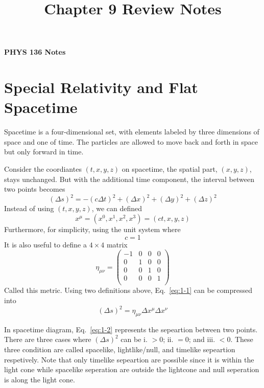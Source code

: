\documentclass[11pt]{article}
\title{Chapter 9 Review Notes}
\theoremstyle{definition}
\numberwithin{equation}{section}
\begin{document}
\begin{center}
{\LARGE \bf PHYS 136 Notes}\\
\end{center}

\section{Special Relativity and Flat Spacetime}

Spacetime is a four-dimensional set, with elements labeled by three dimensions of space and one of time.  The particles are allowed to move back and forth in space but only forward in time.

Consider the coordiantes $(t,x,y,z)$ on spacetime, the spatial part, $(x,y,z)$, stays unchanged. But with the additional time component, the interval between two points becomes
\begin{equation}
    \boxed{(\Delta s)^2 = -(c\Delta t)^2 + (\Delta x)^2 + (\Delta y)^2 + (\Delta z)^2}
    \label{eq:1-1}
\end{equation} 
Instead of using $(t,x,y,z)$, we can defined
\begin{equation}
    x^\mu = (x^0, x^1, x^2, x^3) = (ct,x,y,z)
\end{equation}
Furthermore, for simplicity, using the unit system where
\begin{equation}
    c = 1
\end{equation}
It is also useful to define a $4\times4$ matrix
\begin{equation}
    \eta_{\mu\nu} = \begin{pmatrix}
        -1 & 0 & 0 & 0\\
        0 & 1 & 0 & 0\\
        0 & 0 & 1 & 0\\
        0 & 0 & 0 & 1\\
    \end{pmatrix}
\end{equation}
Called this metric. Using two definitions above, Eq.~\ref{eq:1-1} can be compressed into
\begin{equation}
    (\Delta s)^2 = \eta_{\mu\nu}\Delta x^\mu \Delta x^\nu
    \label{eq:1-2}
\end{equation}

In spacetime diagram, Eq.~\ref{eq:1-2} represents the sepeartion between two points. There are three cases where $(\Delta s)^2$ can be i. $>0$; ii. $=0$; and iii. $<0$. These three condition are called spacelike, lightlike/null, and timelike sepeartion respetively.
Note that only timelike sepeartion are possible since it is within the light cone while spacelike seperation are outside the lightcone and null seperation is along the light cone.    
\end{document}
